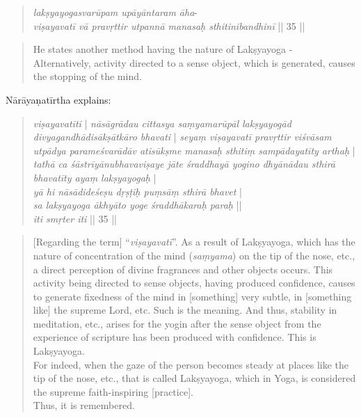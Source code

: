 \begin{quote}
  \textit{lakṣyayogasvarūpam upāyāntaram āha}-\\
  \textit{viṣayavatī vā pravṛttir utpannā manasaḥ sthitinibandhinī} || 35 ||
\end{quote}
\begin{quote}
He states another method having the nature of Lakṣyayoga - \\
Alternatively, activity directed to a sense object, which is generated, causes the stopping of the mind.  
\end{quote}

Nārāyaṇatīrtha explains:

\begin{quote}
  \textit{viṣayavatīti} | \textit{nāsāgrādau cittasya saṃyamarūpāl lakṣyayogād divyagandhādisākṣātkāro bhavati} | \textit{seyaṃ viṣayavatī pravṛttir viśvāsam utpādya parameśvarādāv atisūkṣme manasaḥ sthitiṃ sampādayatīty arthaḥ} | \textit{tathā ca śāstrīyānubhavaviṣaye jāte śraddhayā yogino dhyānādau sthirā bhavatīty ayaṃ lakṣyayogaḥ} |\\

  \textit{yā hi nāsādideśeṣu dṛṣṭiḥ puṃsāṃ sthirā bhavet} |\\
  \textit{sa lakṣyayoga ākhyāto yoge śraddhākaraḥ paraḥ} ||\\
  
\textit{iti smṛter iti} || 35 ||
\end{quote}
\begin{quote}
  [Regarding the term] ``\textit{viṣayavatī}''. As a result of Lakṣyayoga, which has the nature of concentration of the mind (\textit{saṃyama}) on the tip of the nose, etc., a direct perception of divine fragrances and other objects occurs. This activity being directed to sense objects, having produced confidence, causes to generate fixedness of the mind in [something] very subtle, in [something like] the supreme Lord, etc. Such is the meaning. 
  And thus, stability in meditation, etc., arises for the yogin after the sense object from the experience of scripture has been produced with confidence. This is Lakṣyayoga.\\
  
  For indeed, when the gaze of the person becomes steady at places like the tip of the nose, etc., that is called Lakṣyayoga, which in Yoga, is considered the supreme faith-inspiring [practice].\\

  Thus, it is remembered.
  \end{quote}


